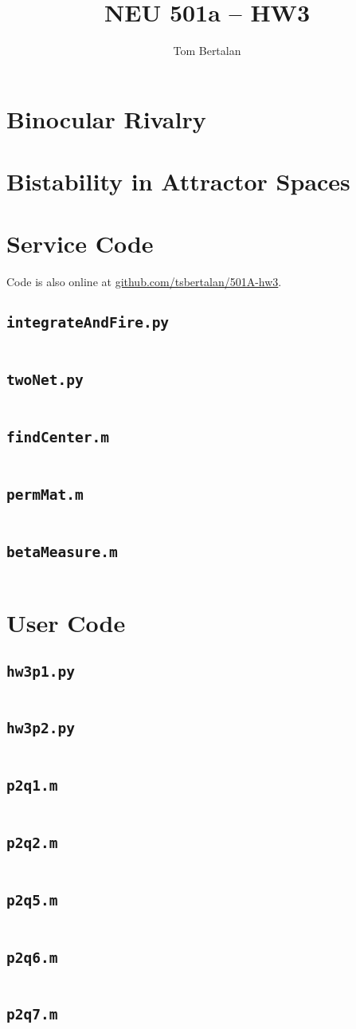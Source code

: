 \documentclass[letterpaper,10pt]{article}
\title{NEU 501a -- HW3}
\author{Tom Bertalan}
\newcommand{\code}[2]{
\subsection{\texttt{#1}}
\label{sec:#1}
% 
\inputminted{#2}{#1}
}
\begin{document}
\maketitle

\section{Binocular Rivalry}


\newpage
\section{Bistability in Attractor Spaces}


\newpage
\section{Service Code}
\label{sec:serviceCode}
Code is also online at
\href{https://github.com/tsbertalan/501A-hw3}{github.com/tsbertalan/501A-hw3}.

\code{integrateAndFire.py}{python}

\newpage
\code{twoNet.py}{python}

\code{findCenter.m}{matlab}
\code{permMat.m}{matlab}
\code{betaMeasure.m}{matlab}

\newpage
\section{User Code}
\label{sec:userCode}

\code{hw3p1.py}{python}

\code{hw3p2.py}{python}

\newpage
\code{p2q1.m}{matlab}

\newpage
\code{p2q2.m}{matlab}

\newpage
\code{p2q5.m}{matlab}

\newpage
\code{p2q6.m}{matlab}

\newpage
\code{p2q7.m}{matlab}
\end{document}
